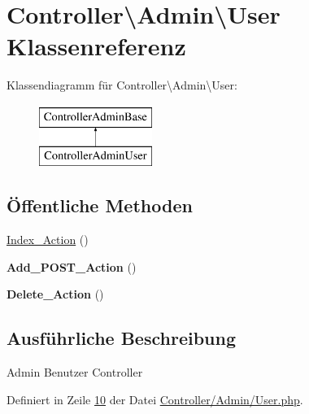 \hypertarget{class_controller_1_1_admin_1_1_user}{\section{Controller\textbackslash{}Admin\textbackslash{}User Klassenreferenz}
\label{class_controller_1_1_admin_1_1_user}
}
Klassendiagramm für Controller\textbackslash{}Admin\textbackslash{}User\-:\begin{figure}[H]
\begin{center}
\leavevmode
\includegraphics[height=2.000000cm]{class_controller_1_1_admin_1_1_user}
\end{center}
\end{figure}
\subsection*{Öffentliche Methoden}
\begin{DoxyCompactItemize}
\item 
\hyperlink{class_controller_1_1_admin_1_1_user_a006c1efe9d23f5307039c1beb0ce18a5}{Index\-\_\-\-Action} ()
\item 
\hypertarget{class_controller_1_1_admin_1_1_user_a381c8672d1cec6440138d0bf939fb5ec}{{\bfseries Add\-\_\-\-P\-O\-S\-T\-\_\-\-Action} ()}\label{class_controller_1_1_admin_1_1_user_a381c8672d1cec6440138d0bf939fb5ec}

\item 
\hypertarget{class_controller_1_1_admin_1_1_user_a96952a534cf944ff774fdab36d8efaaa}{{\bfseries Delete\-\_\-\-Action} ()}\label{class_controller_1_1_admin_1_1_user_a96952a534cf944ff774fdab36d8efaaa}

\end{DoxyCompactItemize}


\subsection{Ausführliche Beschreibung}
Admin Benutzer Controller 

Definiert in Zeile \hyperlink{_controller_2_admin_2_user_8php_source_l00010}{10} der Datei \hyperlink{_controller_2_admin_2_user_8php_source}{Controller/\-Admin/\-User.\-php}.



